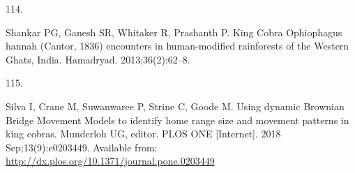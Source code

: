 \documentclass[10pt,a4paper]{article}
\newlength{\cslhangindent}
\newlength{\csllabelwidth}
\newenvironment{CSLReferences}[2] %
{\begin{list}{}{%
	\setlength{\itemindent}{0pt}
	\setlength{\leftmargin}{0pt}
	\setlength{\parsep}{0pt}
	\ifodd #1
	\setlength{\leftmargin}{\cslhangindent}
	\setlength{\itemindent}{-1\cslhangindent}
	\fi
	\setlength{\itemsep}{#2\baselineskip}}}
{\end{list}}
\newcommand{\CSLLeftMargin}[1]{\parbox[t]{\csllabelwidth}{\strut#1\strut}}
\newcommand{\CSLRightInline}[1]{\parbox[t]{\linewidth - \csllabelwidth}{\strut#1\strut}}
\begin{document}
\begin{CSLReferences}{0}{1}
\CSLLeftMargin{114. }%
\CSLRightInline{Shankar PG, Ganesh SR, Whitaker R, Prashanth P. King {Cobra} {Ophiophagus} hannah ({Cantor}, 1836) encounters in human-modified rainforests of the {Western} {Ghats}, {India}. Hamadryad. 2013;36(2):62--8. }

\CSLLeftMargin{115. }%
\CSLRightInline{Silva I, Crane M, Suwanwaree P, Strine C, Goode M. Using dynamic {Brownian} {Bridge} {Movement} {Models} to identify home range size and movement patterns in king cobras. Munderloh UG, editor. PLOS ONE {[}Internet{]}. 2018 Sep;13(9):e0203449. Available from: \url{http://dx.plos.org/10.1371/journal.pone.0203449}}

\end{CSLReferences}
\end{document}
